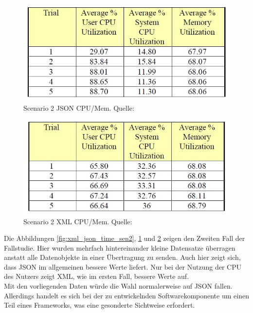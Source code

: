 \documentclass[a4paper]{article}
\begin{document}
	\begin{figure}[H] 
		\includegraphics[width=\linewidth]{../Bilder/json_mem_sen2.jpg}
		\caption{Scenario 2 JSON CPU/Mem. Quelle: \cite{XmlJson}}
		\label{fig:json_mem_sen2}
	\end{figure}
	
	\begin{figure}[H] 
		\includegraphics[width=\linewidth]{../Bilder/xml_mem_sen2.jpg}
		\caption{Scenario 2 XML CPU/Mem. Quelle: \cite{XmlJson}}
		\label{fig:xml_mem_sen2}
	\end{figure}
	
	Die Abbildungen \ref{fig:xml_json_time_sen2}, \ref{fig:json_mem_sen2}
	und \ref{fig:xml_mem_sen2} zeigen den Zweiten Fall der Fallstudie. Hier
	wurden mehrfach hintereinander kleine Datensatze überragen anstatt alle
	Datenobjekte in einer Übertragung zu senden. Auch hier zeigt sich, dass
	JSON im allgemeinen bessere Werte liefert. Nur bei der Nutzung der CPU des
	Nutzers zeigt XML, wie im ersten Fall, bessere Werte auf. \\
	 
	Mit den vorliegenden Daten würde die Wahl normalerweise auf JSON fallen.
	Allerdings handelt es sich bei der zu entwickelnden Softwarekomponente um
	einen Teil eines Frameworks, was eine gesonderte Sichtweise erfordert. 
	
\end{document}
